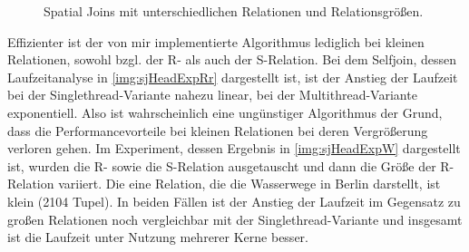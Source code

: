 \documentclass[a4paper,12pt,twoside]{article}
\begin{document}
{\begin{figure}
	\centering
	\qquad	
	\caption{Spatial Joins mit unterschiedlichen Relationen und Relationsgrößen.}
	\label{img:sjExpHeadAllg}
\end{figure}

Effizienter ist der von mir implementierte Algorithmus lediglich bei kleinen Relationen, sowohl bzgl. der R- als auch der S-Relation. Bei dem Selfjoin, dessen Laufzeitanalyse in \autoref{img:sjHeadExpRr} dargestellt ist, ist der Anstieg der Laufzeit bei der Singlethread-Variante nahezu linear, bei der Multithread-Variante exponentiell. Also ist wahrscheinlich eine ungünstiger Algorithmus der Grund, dass die Performancevorteile bei kleinen Relationen bei deren Vergrößerung verloren gehen. Im Experiment, dessen Ergebnis in \autoref{img:sjHeadExpW} dargestellt ist, wurden die R- sowie die S-Relation ausgetauscht und dann die Größe der R-Relation variiert. Die eine Relation, die die Wasserwege in Berlin darstellt, ist klein (2104 Tupel). In beiden Fällen ist der Anstieg der Laufzeit im Gegensatz zu großen Relationen noch vergleichbar mit der Singlethread-Variante und insgesamt ist die Laufzeit unter Nutzung mehrerer Kerne besser. 

}
\end{document}
